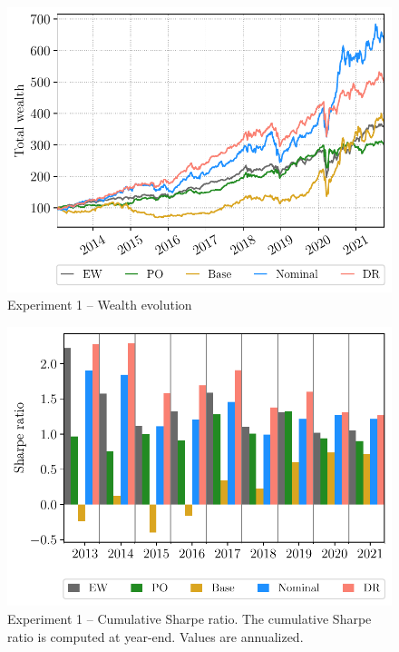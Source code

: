 \documentclass[10pt, twocolumn]{article}
\theoremstyle{plain}
\theoremstyle{definition}
\begin{document}
\begin{figure}[ht]
\begin{center}
\centerline{\includegraphics[width=\columnwidth]{figs/wealth_exp1.pdf}}
\caption{Experiment 1 -- Wealth evolution}
\label{fig:exp1_wealth}
\end{center}
\vskip -0.2in
\end{figure}

\begin{figure}[ht]
\begin{center}
\centerline{\includegraphics[width=\columnwidth]{figs/sr_bar_exp1.pdf}}
\caption{Experiment 1 -- Cumulative Sharpe ratio. The cumulative Sharpe ratio is computed at year-end. Values are annualized.}
\label{fig:exp1_sr}
\end{center}
\vskip -0.2in
\end{figure}
\end{document}
